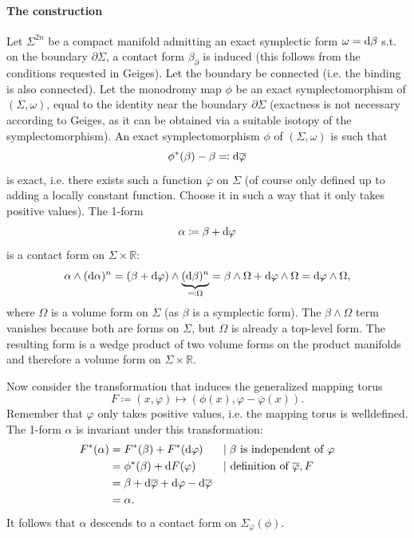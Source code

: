 \paragraph*{The construction}

Let $\Sigma^{2n}$ be a compact manifold admitting an exact symplectic form $\omega = \mathrm{d} \beta$ s.t. on the boundary $\partial \Sigma$, a contact form $\beta_\partial$ is induced (this follows from the conditions requested in Geiges).
Let the boundary be connected (i.e. the binding is also connected).
Let the monodromy map $\phi$ be an exact symplectomorphism of $(\Sigma, \omega)$,
equal to the identity near the boundary $\partial \Sigma$ (exactness is not necessary according to Geiges, as it can be obtained via a suitable isotopy of the symplectomorphism).
An exact symplectomorphism $\phi$ of $(\Sigma, \omega)$ is such that
\[
    \phi^*(\beta) - \beta \eqqcolon \mathrm{d} \overline{\varphi}  
\]
is exact, i.e. there exists such a function $\overline{\varphi}$ on $\Sigma$ (of course only defined up to adding a locally constant function. Choose it in such a way that it only takes positive values).
The 1-form 
\[
    \alpha \coloneqq \beta + \mathrm{d} \varphi
\]
is a contact form on $\Sigma \times \mathbb R$:
\[
    \alpha \wedge (\mathrm{d} \alpha)^{n} = (\beta + \mathrm{d} \varphi)\wedge \underbrace{(\mathrm{d} \beta)^n}_{\eqqcolon \Omega} = \beta \wedge \Omega + \mathrm{d} \varphi \wedge \Omega = \mathrm{d} \varphi \wedge \Omega,
\]
where $\Omega$ is a volume form on $\Sigma$ (as $\beta$ is a symplectic form).
The $\beta \wedge \Omega$ term vanishes because both are forms on $\Sigma$, but $\Omega$ is already a top-level form.
The resulting form is a wedge product of two volume forms on the product manifolds and therefore a volume form on $\Sigma \times \mathbb R$.

Now consider the transformation that induces the generalized mapping torus
\[
    F \coloneqq (x,\varphi) \mapsto (\phi(x), \varphi - \overline{\varphi}(x)).    
\]
Remember that $\varphi$ only takes positive values, i.e. the mapping torus is welldefined.
The 1-form $\alpha$ is invariant under this transformation:
\begin{align*}
    F^*(\alpha) &= F^*(\beta) + F^*(\mathrm{d} \varphi)&&|\;\beta\text{ is independent of }\varphi\\
    &= \phi^*(\beta) + \mathrm{d} F(\varphi)&&|\text{ definition of }\overline{\varphi}, F\\
    &= \beta + \mathrm{d}\overline{\varphi} + \mathrm{d} \varphi - \mathrm{d} \overline{\varphi}\\
    &= \alpha.
\end{align*}
It follows that $\alpha$ descends to a contact form on $\Sigma_{\overline{\varphi}}(\phi)$. 

